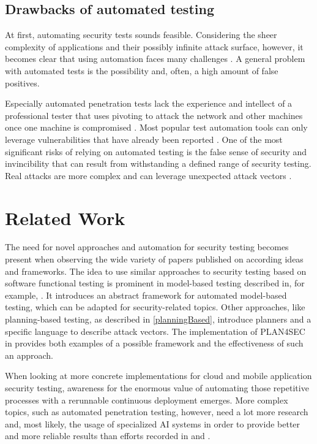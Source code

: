 \subsection{Drawbacks of automated testing}
\label{drawbackAutomated}
At first, automating security tests sounds feasible. Considering the sheer complexity of applications and their possibly infinite attack surface, however, it becomes clear that using automation faces many challenges \citep{stefinko2016}.
A general problem with automated tests is the possibility and, often, a high amount of false positives. 

Especially automated penetration tests lack the experience and intellect of a professional tester that uses pivoting to attack the network and other machines once one machine is compromised \citep{stefinko2016}.
Most popular test automation tools can only leverage vulnerabilities that have already been reported \citep{autoPentestOverview2018}. One of the most significant risks of relying on automated testing is the false sense of security and invincibility that can result from withstanding a defined range of security testing. Real attacks are more complex and can leverage unexpected attack vectors \citep{stefinko2016}.


\section{Related Work}
\label{relatedWork}
The need for novel approaches and automation for security testing becomes present when observing the wide variety of papers published on according ideas and frameworks.
The idea to use similar approaches to security testing based on software functional testing is prominent in model-based testing described in, for example, \citep{torxAMBT2003}. It introduces an abstract framework for automated model-based testing, which can be adapted for security-related topics.
Other approaches, like planning-based testing, as described in \ref{planningBased}, introduce planners and a specific language to describe attack vectors. The implementation of PLAN4SEC in \citep{wotawa2014} provides both examples of a possible framework and the effectiveness of such an approach.

When looking at more concrete implementations for cloud \citep{cloudSec2017} and mobile application \citep{androidTesting2012} security testing, awareness for the enormous value of automating those repetitive processes with a rerunnable continuous deployment emerges. More complex topics, such as automated penetration testing, however, need a lot more research and, most likely, the usage of specialized AI systems in order to provide better and more reliable results than efforts recorded in \citep{autoPentestOverview2018} and \citep{automatedPentesting2011}.


